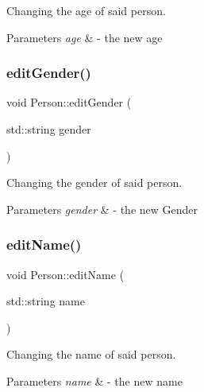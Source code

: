 Changing the age of said person. 


\begin{DoxyParams}{Parameters}
{\em age} & -\/ the new age \\
\hline
\end{DoxyParams}
\mbox{\label{class_person_a3462440c2938aaea073cdaeeb9c0ad9d}} 
\subsubsection{\texorpdfstring{edit\+Gender()}{editGender()}}
{\footnotesize\ttfamily void Person\+::edit\+Gender (\begin{DoxyParamCaption}\item[{std\+::string}]{gender }\end{DoxyParamCaption})}



Changing the gender of said person. 


\begin{DoxyParams}{Parameters}
{\em gender} & -\/ the new Gender \\
\hline
\end{DoxyParams}
\mbox{\label{class_person_ade234dfe2fb73a9ae41bac93b52c17c6}} 
\subsubsection{\texorpdfstring{edit\+Name()}{editName()}}
{\footnotesize\ttfamily void Person\+::edit\+Name (\begin{DoxyParamCaption}\item[{std\+::string}]{name }\end{DoxyParamCaption})}



Changing the name of said person. 


\begin{DoxyParams}{Parameters}
{\em name} & -\/ the new name \\
\hline
\end{DoxyParams}
\mbox{\label{class_person_a4b66dbee570398920b8fb6aacddd2559}} 
